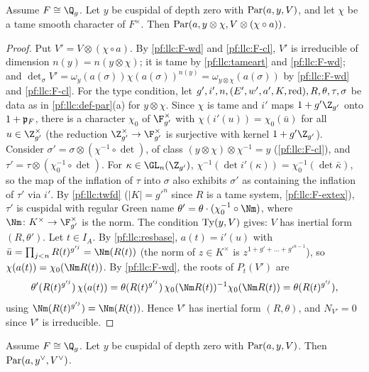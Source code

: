 \begin{proposition}\label{pf:llc:partw}
Assume $F\cong\Q_g$. Let $y$ be cuspidal of depth zero with $\operatorname{Par}(a,y,V)$, and let $\chi$ be a tame smooth
character of $F^\times$. Then $\operatorname{Par}(a,y\otimes\chi,V\otimes(\chi\circ a))$. 
\end{proposition}

\begin{proof}
Put $V'=V\otimes(\chi\circ a)$. By \ref{pf:llc:F-wd} and \ref{pf:llc:F-cl}, $V'$ is irreducible of dimension
$n(y)=n(y\otimes\chi)$; it is tame by \cref{pf:llc:tameart} and \ref{pf:llc:F-wd}; and
$\det_\sigma V'=\omega_y(a(\sigma))\chi(a(\sigma))^{n(y)}=\omega_{y\otimes\chi}(a(\sigma))$ by \ref{pf:llc:F-wd} and
\ref{pf:llc:F-cl}. For the type condition, let $g',i',n,(E',w',a',K,\operatorname{red}),R,\theta,\tau,\sigma$ be data as in
\cref{pf:llc:def-par}(a) for $y\otimes\chi$. Since $\chi$ is tame and $i'$ maps $1+g'\Z_{g'}$ onto $1+\mathfrak p_F$, there is a
character $\chi_0$ of $\F_{g'}^\times$ with $\chi(i'(u))=\chi_0(\bar u)$ for all $u\in\Z_{g'}^\times$ (the reduction
$\Z_{g'}^\times\to\F_{g'}^\times$ is surjective with kernel $1+g'\Z_{g'}$). Consider $\sigma'=\sigma\otimes(\chi^{-1}\circ\det)$, of
class $(y\otimes\chi)\otimes\chi^{-1}=y$ (\ref{pf:llc:F-cl}), and $\tau'=\tau\otimes(\chi_0^{-1}\circ\det)$. For
$\kappa\in\GL_n(\Z_{g'})$, $\chi^{-1}(\det i'(\kappa))=\chi_0^{-1}(\det\bar\kappa)$, so the map of the inflation of $\tau$
into $\sigma$ also exhibits $\sigma'$ as containing the inflation of $\tau'$ via $i'$. By \cref{pf:llc:twfd} ($|K|=g'^n$
since $R$ is a tame system, \ref{pf:llc:F-extex}), $\tau'$ is cuspidal with regular Green name
$\theta'=\theta\cdot(\chi_0^{-1}\circ\Nm)$, where $\Nm\colon K^\times\to\F_{g'}^\times$ is the norm. The condition $\operatorname{Ty}(y,V)$
gives: $V$ has inertial form $(R,\theta')$. Let $t\in I_A$. By \cref{pf:llc:resbase}, $a(t)=i'(u)$ with
$\bar u=\prod_{j<n}R(t)^{g'^j}=\Nm(R(t))$ (the norm of $z\in K^\times$ is $z^{1+g'+\dots+g'^{n-1}}$), so
$\chi(a(t))=\chi_0(\Nm R(t))$. By \ref{pf:llc:F-wd}, the roots of
$P_t(V')$ are
\[
  \theta'(R(t)^{g'^j})\,\chi(a(t))=\theta(R(t)^{g'^j})\,\chi_0(\Nm R(t))^{-1}\chi_0(\Nm R(t))=\theta(R(t)^{g'^j}),
\]
using $\Nm(R(t)^{g'^j})=\Nm(R(t))$. Hence $V'$ has inertial form $(R,\theta)$, and $N_{V'}=0$ since $V'$ is
irreducible.
\end{proof}

\begin{proposition}\label{pf:llc:pardual}
Assume $F\cong\Q_g$. Let $y$ be cuspidal of depth zero with $\operatorname{Par}(a,y,V)$. Then $\operatorname{Par}(a,y^\vee,V^\vee)$.
\end{proposition}

